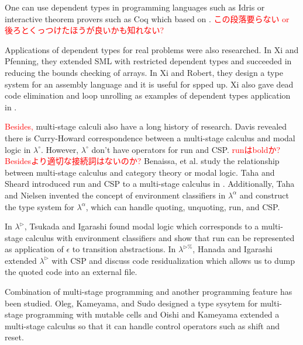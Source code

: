 \documentclass[runningheads]{llncs}
\newcommand{\red}[1]{\textcolor{red}{#1 }}
\newcommand{\LTP}{$\lambda^{\triangleright\%}$\xspace}
\newcommand{\TW}{\triangleright}
\begin{document}
									One can use dependent types in programming languages such as Idris\cite{brady2013idris} or
									interactive theorem provers such as Coq\cite{09thecoq} which based on \cite{coquand:inria-00076024}.
									\red{この段落要らない or 後ろとくっつけたほうが良いかも知れない?}
									
									
									Applications of dependent types for real problems were also researched.
									In Xi and Pfenning\cite{Xi98}, they extended SML with restricted dependent types
									and succeeded in reducing the bounds checking of arrays.
									In Xi and Robert\cite{xi2001dependently}, they design a type system for an assembly language and
									it is useful for spped up.
									Xi also gave dead code elimination and loop unrolling as examples of dependent types application in \cite{xi1999dependent}.
									
									
									\red{Besides,} multi-stage calculi also have a long history of research.
									Davis revealed there is Curry-Howard correspondence between a multi-stage calculus and modal logic in $\lambda^\circ$\cite{davies1996temporal}.
									However, $\lambda^\circ$ don't have operators for run and CSP.
									\red{runはboldか? Besidesより適切な接続詞はないのか?}
									Benaissa, et al. \cite{benaissa1999logical} study the relationship between multi-stage calculus and category theory or modal logic.
									Taha and Sheard introduced run and CSP to a multi-stage calculus in \cite{MetaML}.
									Additionally, Taha and Nielsen invented the concept of environment classifiers in $\lambda^\alpha$\cite{taha2003environment} and 
									construct the type system for $\lambda^\alpha$, which can handle quoting, unquoting, run, and CSP.
									
									In $\lambda^\TW$\cite{Tsukada}, Tsukada and Igarashi found modal logic which corresponds to a multi-stage calculus with environment classifiers and
									show that run can be represented as application of $\epsilon$ to transition abstractions.
									In \LTP\cite{Hanada2014}, Hanada and Igarashi extended $\lambda^\TW$ with CSP and discuss code residualization 
									which allows us to dump the quoted code into an external file.
									
									
									Combination of multi-stage programming and another programming feature has been studied.
									Oleg, Kameyama, and Sudo\cite{kiselyov2016refined} designed a type sysytem for multi-stage programming with mutable cells and
									Oishi and Kameyama\cite{oishi2017staging} extended a multi-stage calculus so that it can handle control operators such as shift and reset.
									
\end{document}
